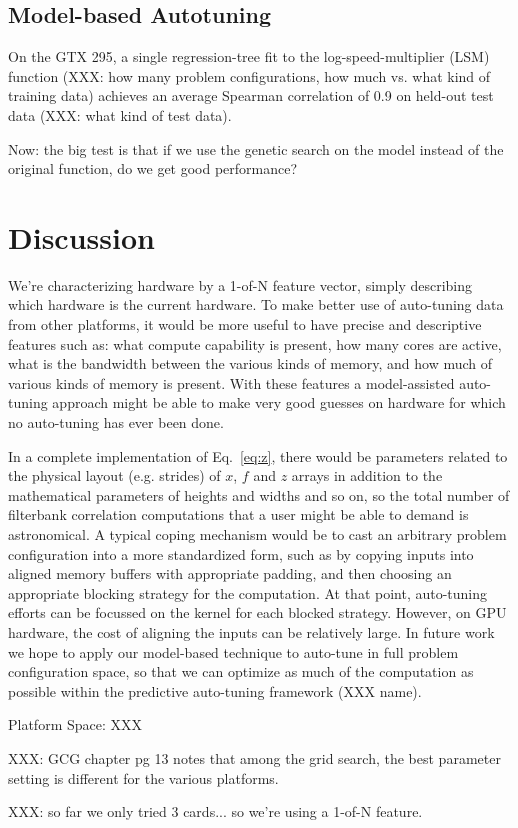 \documentclass{sig-alternate}
\begin{document}
\subsection{Model-based Autotuning}

On the GTX 295, a single regression-tree fit to the log-speed-multiplier
(LSM) function (XXX: how many problem configurations, how much vs. what
kind of training data) achieves an average Spearman correlation of 0.9 on
held-out test data (XXX: what kind of test data).

Now: the big test is that if we use the genetic search on the model instead of
the original function, do we get good performance?

\section{Discussion}

We're characterizing hardware by a 1-of-N feature vector, simply describing
which hardware is the current hardware.
To make better use of auto-tuning data from other platforms, it would be more
useful to have precise and descriptive features such as: what compute
capability is present, how many cores are active, what is the bandwidth
between the various kinds of memory, and how much of various kinds of memory
is present.  With these features a model-assisted auto-tuning approach
might be able to make very good guesses on hardware for which no auto-tuning
has ever been done.

In a complete implementation of Eq.~\ref{eq:z}, there would be parameters
related to the physical layout (e.g. strides) of $x$, $f$ and $z$ arrays in
addition to the mathematical parameters of heights and widths and so on,
so the total number of filterbank correlation computations that a user might
be able to demand is astronomical.
A typical coping mechanism would be to cast an arbitrary problem configuration into a more
standardized form, such as by copying inputs into aligned memory buffers with
appropriate padding, and then choosing an appropriate blocking strategy for
the computation. At that point, auto-tuning efforts can be focussed on the
kernel for each blocked strategy. However, on GPU hardware, the cost of
aligning the inputs can be relatively large.  In future work we hope to apply
our model-based technique to auto-tune in full problem configuration space, so
that we can optimize as much of the computation as possible within the
predictive auto-tuning framework (XXX name).

Platform Space: XXX

XXX: GCG chapter pg 13 notes that among the grid search, the best parameter
setting is different for the various platforms.

XXX: so far we only tried 3 cards... so we're using a 1-of-N feature.



\end{document}
